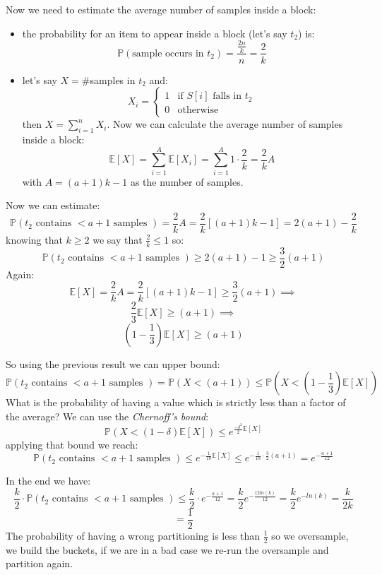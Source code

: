 Now we need to estimate the average number of samples inside a block:
\begin{itemize}
    \item the probability for an item to appear inside a block (let's say $t_2$) is:
    $$
        \mathbb{P}(\text{sample occurs in }t_2) = \frac{ \frac{2n}{k} }{n} = \frac{2}{k}
    $$
    
    \item let's say $X = \#$samples in $t_2$ and:
    $$
    X_i = 
    \begin{cases}
      1 & \text{if $S[i]$ falls in $t_2$} \\
      0 & \text{otherwise}
    \end{cases}
    $$
    then $X = \sum_{i=1}^n X_i$. Now we can calculate the average number of samples inside a block:
    $$
        \mathbb{E}[X] = \sum_{i=1}^{A} \mathbb{E}[X_i] = \sum_{i=1}^{A} 1 \cdot \frac{2}{k} = \frac{2}{k} A
    $$
    with $A=(a+1)k - 1$ as the number of samples.
\end{itemize}
Now we can estimate:
$$
    \mathbb{P} (t_2 \text{ contains } < a+1 \text{ samples }) = \frac{2}{k}A = \frac{2}{k}\left[ (a+1)k -1 \right] = 2(a+1) - \frac{2}{k} 
$$
knowing that $k \geq 2$ we say that $\frac{2}{k} \leq 1$ so:
$$
    \mathbb{P} (t_2 \text{ contains } < a+1 \text{ samples }) \geq 2(a+1)-1 \geq \frac{3}{2}(a+1)
$$
Again:
$$
    \mathbb{E}[X]=\frac{2}{k}A = \frac{2}{k}[(a+1)k - 1] \geq \frac{3}{2}(a+1) \implies
$$
$$
    \frac{2}{3}\mathbb{E}[X] \geq (a+1) \implies
$$
$$
    \left(1-\frac{1}{3}\right)\mathbb{E}[X] \geq (a+1)
$$

So using the previous result we can upper bound:
$$
    \mathbb{P} (t_2 \text{ contains } < a+1 \text{ samples }) = \mathbb{P}\left(X < (a+1)\right) \leq \mathbb{P}\left(X < \left(1-\frac{1}{3}\right) \mathbb{E}[X] \right)
$$
What is the probability of having a value which is strictly less than a factor of the average?
We can use the \emph{Chernoff's bound}:
$$
    \mathbb{P}(X < (1- \delta)\mathbb{E}[X] ) \leq e^{\frac{-\delta^2}{2}\mathbb{E}[X]}
$$
applying that bound we reach:
$$
    \mathbb{P} (t_2 \text{ contains } < a+1 \text{ samples }) \leq e^{-\frac{1}{18}\mathbb{E}[X]} \leq e^{-\frac{1}{18} \cdot \frac{3}{2}(a+1)} = e^{-\frac{a+1}{12}}
$$

In the end we have:
$$
    \frac{k}{2} \cdot \mathbb{P} (t_2 \text{ contains } < a+1 \text{ samples }) \leq \frac{k}{2} \cdot e^{-\frac{a+1}{12}} = \frac{k}{2} e^{-\frac{12ln(k)}{12}} = \frac{k}{2}e^{-ln(k)} = \frac{k}{2k}
$$
$$
    = \frac{1}{2}
$$
The probability of having a wrong partitioning is less than $\frac{1}{2}$ so we oversample, we build the buckets, if we are in a bad case we re-run the oversample and partition again.

